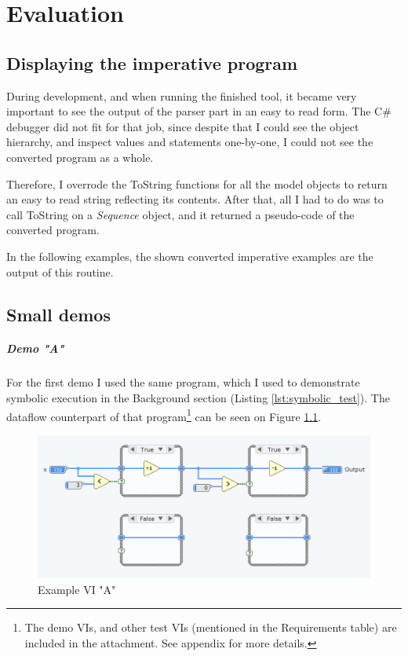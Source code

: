 \chapter{Evaluation}
\section{Displaying the imperative program}
During development, and when running the finished tool, it became very important to see the output of the parser part in an easy to read form. The C\# debugger did not fit for that job, since despite that I could see the object hierarchy, and inspect values and statements one-by-one, I could not see the converted program as a whole. 

Therefore, I overrode the ToString functions for all the model objects to return an easy to read string reflecting its contents. After that, all I had to do was to call ToString on a \textit{Sequence} object, and it returned a pseudo-code of the converted program.

In the following examples, the shown converted imperative examples are the output of this routine.
\section{Small demos}
\paragraph{Demo "A"}
For the first demo I used the same program, which I used to demonstrate symbolic execution in the Background section (Listing \ref{lst:symbolic_test}). The dataflow counterpart of that program\footnote{The demo VIs, and other test VIs (mentioned in the Requirements table) are included in the attachment. See appendix for more details.} can be seen on Figure \ref{fig:testvi1}.
\begin{figure}
\centering
\includegraphics[width=150mm,keepaspectratio]{figures/testvi1.png}
\caption{Example VI "A"} 
\label{fig:testvi1}
\end{figure}


